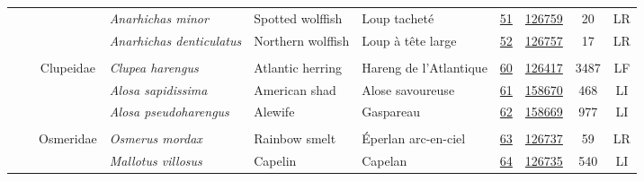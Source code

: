 \documentclass[12pt]{article}\usepackage[]{graphicx}\usepackage[]{color}
\begin{document}
\begin{landscape}
\begin{longtable}[t]{ccc>{\centering\arraybackslash}p{3cm}>{\centering\arraybackslash}p{3cm}>{\centering\arraybackslash}p{3cm}>{}c>{}ccc}
\nopagebreak
\hspace{1em}\hspace{1em} &  &  & \em{Anarhichas minor} & Spotted wolffish & Loup tacheté & \href{#sec:51}{51} & \href{http://www.marinespecies.org/aphia.php?p=taxdetails&id=126759}{126759} & 20 & LR\\
\nopagebreak
\hspace{1em}\hspace{1em} &  &  & \em{Anarhichas denticulatus} & Northern wolffish & Loup à tête large & \href{#sec:52}{52} & \href{http://www.marinespecies.org/aphia.php?p=taxdetails&id=126757}{126757} & 17 & LR\\
\nopagebreak
\addlinespace[0.3em]
\\
\hspace{1em}\hspace{1em} &  & Clupeidae & \em{Clupea harengus} & Atlantic herring & Hareng de l'Atlantique & \href{#sec:60}{60} & \href{http://www.marinespecies.org/aphia.php?p=taxdetails&id=126417}{126417} & 3487 & LF\\
\nopagebreak
\hspace{1em}\hspace{1em} &  &  & \em{Alosa sapidissima} & American shad & Alose savoureuse & \href{#sec:61}{61} & \href{http://www.marinespecies.org/aphia.php?p=taxdetails&id=158670}{158670} & 468 & LI\\
\nopagebreak
\hspace{1em}\hspace{1em} &  &  & \em{Alosa pseudoharengus} & Alewife & Gaspareau & \href{#sec:62}{62} & \href{http://www.marinespecies.org/aphia.php?p=taxdetails&id=158669}{158669} & 977 & LI\\
\nopagebreak
\addlinespace[0.3em]
\\
\hspace{1em}\hspace{1em} &  & Osmeridae & \em{Osmerus mordax} & Rainbow smelt & Éperlan arc-en-ciel & \href{#sec:63}{63} & \href{http://www.marinespecies.org/aphia.php?p=taxdetails&id=126737}{126737} & 59 & LR\\
\nopagebreak
\hspace{1em}\hspace{1em} &  &  & \em{Mallotus villosus} & Capelin & Capelan & \href{#sec:64}{64} & \href{http://www.marinespecies.org/aphia.php?p=taxdetails&id=126735}{126735} & 540 & LI\\

\end{longtable}
\end{landscape}
\end{document}
